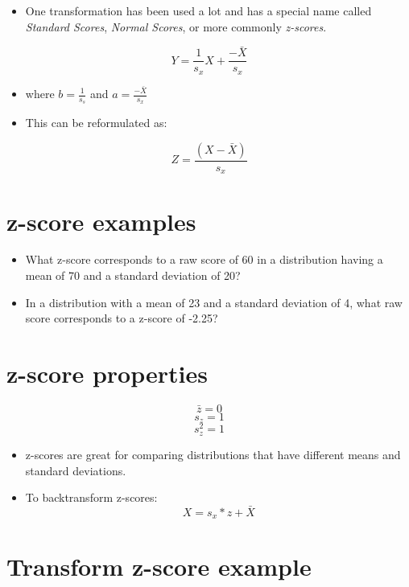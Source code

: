 \documentclass[12pt]{article}
\begin{document}
\begin{itemize}
\itemsep1pt\parskip0pt
\item
  One transformation has been used a lot and has a special name called
  \emph{Standard Scores}, \emph{Normal Scores}, or more commonly
  \emph{z-scores}.
\end{itemize}

\[Y = \frac{1}{s_{x}}X + \frac{-\bar{X}}{s_{x}}\]

\begin{itemize}
\item
  where \(b = \frac{1}{s_{s}}\) and \(a = \frac{-\bar{X}}{s_{x}}\)
\item
  This can be reformulated as:
\end{itemize}

\[Z = \frac{(X - \bar{X})}{s_{x}}\]

\section{z-score examples}\label{z-score-examples}

\begin{itemize}
\itemsep1pt\parskip0pt
\item
  What z-score corresponds to a raw score of 60 in a distribution having
  a mean of 70 and a standard deviation of 20?
\item
  In a distribution with a mean of 23 and a standard deviation of 4,
  what raw score corresponds to a z-score of -2.25?
\end{itemize}

\section{z-score properties}\label{z-score-properties}

\[\bar{z} = 0\] \[s_{z} = 1\] \[s_{z}^2 = 1\]

\begin{itemize}
\item
  z-scores are great for comparing distributions that have different
  means and standard deviations.
\item
  To backtransform z-scores: \[X = s_{x} * z + \bar{X}\]
\end{itemize}

\section{Transform z-score example}\label{transform-z-score-example}
\end{document}
